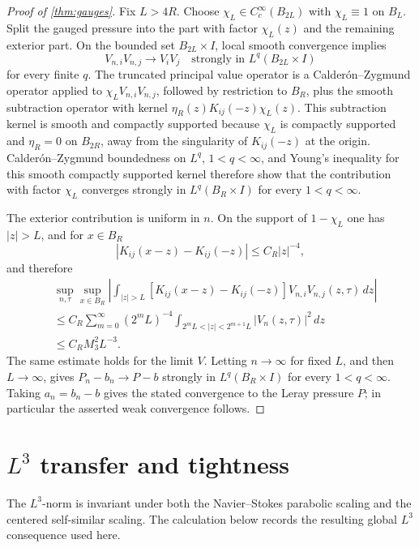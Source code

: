 \documentclass[11pt]{amsart}
\theoremstyle{plain}
\theoremstyle{definition}
\theoremstyle{remark}
\numberwithin{equation}{section}
\begin{document}
\begin{proof}[Proof of \cref{thm:gauges}]
Fix \(L>4R\).  Choose \(\chi_L\in C_c^\infty(B_{2L})\) with
\(\chi_L\equiv1\) on \(B_L\).  Split the gauged pressure into the part with
factor \(\chi_L(z)\) and the remaining exterior part.  On the bounded set
\(B_{2L}\times I\), local smooth convergence implies
\[
   V_{n,i}V_{n,j}\to V_iV_j
   \quad\text{strongly in }L^q(B_{2L}\times I)
\]
for every finite \(q\).  The truncated principal value operator is a
Calder\'on--Zygmund operator applied to \(\chi_L V_{n,i}V_{n,j}\), followed
by restriction to \(B_R\), plus the smooth subtraction operator with kernel
\(\eta_R(z)K_{ij}(-z)\chi_L(z)\).  This subtraction kernel is smooth and
compactly supported because \(\chi_L\) is compactly supported and
\(\eta_R=0\) on \(B_{2R}\), away from the singularity of \(K_{ij}(-z)\) at
the origin.  Calder\'on--Zygmund boundedness on \(L^q\),
\(1<q<\infty\), and Young's inequality for this smooth compactly supported
kernel therefore show that the contribution with factor \(\chi_L\)
converges strongly in \(L^q(B_R\times I)\) for every \(1<q<\infty\).

The exterior contribution is uniform in \(n\).  On the support of
\(1-\chi_L\) one has \(|z|>L\), and for \(x\in B_R\)
\[
   |K_{ij}(x-z)-K_{ij}(-z)|\le C_R|z|^{-4},
\]
and therefore
\[
\begin{aligned}
   &\sup_{n,\tau}\sup_{x\in B_R}
      \left|
         \int_{|z|>L}[K_{ij}(x-z)-K_{ij}(-z)]
         V_{n,i}V_{n,j}(z,\tau)\,dz
      \right| \\
   &\le
   C_R\sum_{m=0}^\infty (2^mL)^{-4}
      \int_{2^mL<|z|<2^{m+1}L}|V_n(z,\tau)|^2\,dz  \\
   &\le C_R M_3^2 L^{-3}.
\end{aligned}
\]
The same estimate holds for the limit \(V\).  Letting \(n\to\infty\) for fixed
\(L\), and then \(L\to\infty\), gives
\(P_n-b_n\to P-b\) strongly in \(L^q(B_R\times I)\) for every
\(1<q<\infty\).  Taking \(a_n=b_n-b\) gives the stated convergence to the
Leray pressure \(P\); in particular the asserted weak convergence follows.
\end{proof}

\section{\texorpdfstring{\(L^3\)}{L3} transfer and tightness}

The \(L^3\)-norm is invariant under both the Navier--Stokes parabolic scaling
and the centered self-similar scaling.  The calculation below records the
resulting global \(L^3\) consequence used here.
\end{document}
